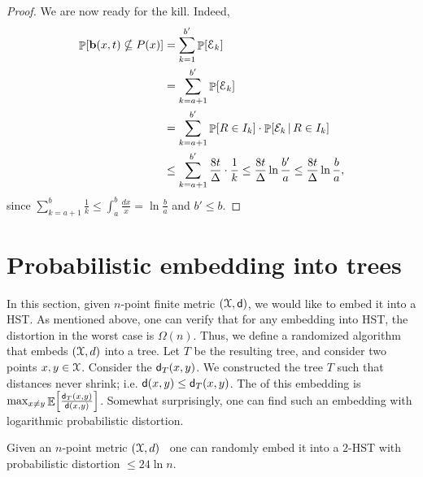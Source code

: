 \begin{proof}
    We are now ready for the kill. Indeed,
    \begin{align*}
      \Prob{\Ball(x,t) \nsubseteq P(x)}%
      &=%
        \sum_{k=1}^{b'} \Prob{\Event_k}
      \\&
        = \sum_{k=a+1}^{b'} \Prob{\Event_k}
      \\&
        =%
        \sum_{k=a+1}^{b'} \Prob{R \in I_k} \cdot \Prob{\mathcal
        E_k\,|\,R \in I_k}     %
      \\&
      \leq%
      \sum_{k=a+1}^{b'} \frac{8t}{\Delta} \cdot \frac{1}{k}%
      \leq%
      \frac{8t}{\Delta} \ln \frac{b'}{a}%
      \leq%
      \frac{8t}{\Delta} \ln \frac{b}{a},
    \end{align*}
    since $\sum_{k=a+1}^b \frac{1}{k} \leq \int_{a}^b \frac{dx}{x} =
    \ln \frac{b}{a}$ and $b' \leq b$.
\end{proof}



\section{Probabilistic embedding into trees}

In this section, given $n$-point finite metric $(\FMS,\DistChar)$, we
would like to embed it into a HST. As mentioned above, one can verify
that for any embedding into HST, the distortion in the worst case is
$\Omega(n)$.  Thus, we define a randomized algorithm that embeds
$(\FMS,d)$ into a tree. Let $T$ be the resulting tree, and consider
two points $x,y \in \FMS$. Consider the 
$\mathsf{d}_T(x,y)$. We constructed the tree $T$ such that distances never
shrink; i.e.  $\mathsf{d}(x,y) \leq \mathsf{d}_T(x,y)$. The  of this embedding is $\max_{x\ne y}
\mathop{\mathbb{E}}\!\left[ {\frac{\mathsf{d}_T(x,y)}{\mathsf{d}(x,y)}} \right]$.  Somewhat surprisingly, one can
find such an embedding with logarithmic probabilistic distortion.




\begin{theorem}
    Given an $n$-point metric $(\FMS,d)$\  one can randomly embed it into a
    $2$-HST  with probabilistic distortion $\leq 24 \ln n$.

\end{theorem}

